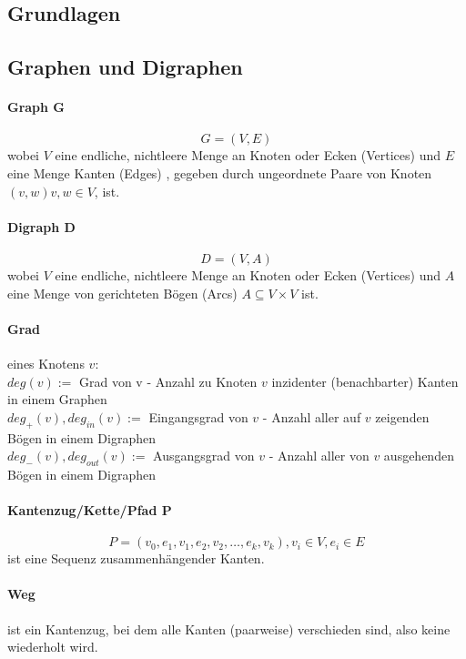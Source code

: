 \documentclass[10pt,a4paper,landscape]{article}
\begin{document}
	\begin{multicols*}{3}
        \tiny

        
        \section{ Grundlagen }
            \subsection{ Graphen und Digraphen }
            
            \paragraph*{ Graph G }
            \[ G = (V,E) \]
            wobei $V$ eine endliche, nichtleere Menge an Knoten oder Ecken (Vertices) und $E$ eine Menge Kanten (Edges) 
            , gegeben durch ungeordnete Paare von Knoten $(v,w) v, w \in V$, ist.
            
            \paragraph*{ Digraph D }
            \[ D = (V,A)\]
            wobei $V$ eine endliche, nichtleere Menge an Knoten oder Ecken (Vertices) und $A$ eine Menge von gerichteten 
            Bögen (Arcs) $A \subseteq V \times V$ ist.

            \paragraph*{ Grad } eines Knotens $v$: \\
            $deg(v) :=$ Grad von v - Anzahl zu Knoten $v$ inzidenter (benachbarter) Kanten in einem Graphen \\
            $deg_{+}(v), deg_{in}(v) :=$ Eingangsgrad von $v$ - Anzahl aller auf $v$ zeigenden Bögen in einem Digraphen \\
            $deg_{-}(v), deg_{out}(v) :=$ Ausgangsgrad von $v$ - Anzahl aller von $v$ ausgehenden Bögen in einem Digraphen 

            \paragraph*{ Kantenzug/Kette/Pfad P }
            \[ P = (v_0, e_1, v_1, e_2, v_2, \dots, e_k, v_k), v_i \in V, e_i \in E \]
            ist eine Sequenz zusammenhängender Kanten. 
            \paragraph*{ Weg } ist ein Kantenzug, bei dem alle Kanten (paarweise) verschieden sind, also keine wiederholt wird.

\end{multicols*}
\end{document}
